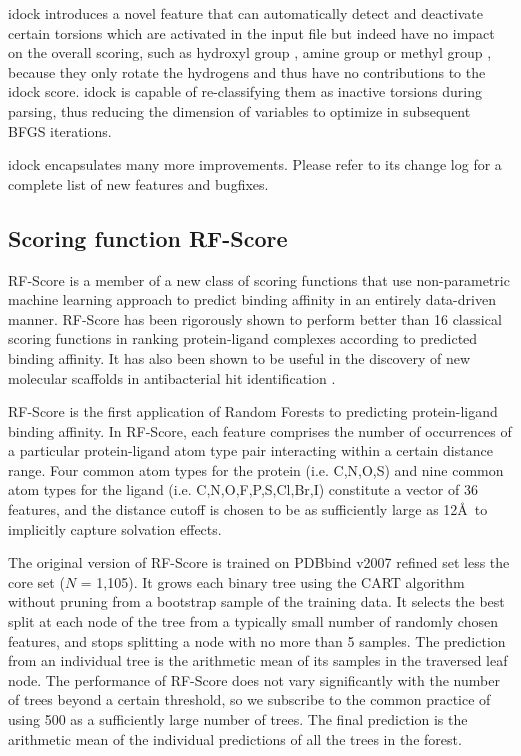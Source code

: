 idock introduces a novel feature that can automatically detect and deactivate certain torsions which are activated in the input file but indeed have no impact on the overall scoring, such as hydroxyl group , amine group  or methyl group , because they only rotate the hydrogens and thus have no contributions to the idock score. idock is capable of re-classifying them as inactive torsions during parsing, thus reducing the dimension of variables to optimize in subsequent BFGS iterations.

idock encapsulates many more improvements. Please refer to its change log for a complete list of new features and bugfixes.

\subsection{Scoring function RF-Score}

RF-Score \citep{564} is a member of a new class of scoring functions that use non-parametric machine learning approach to predict binding affinity in an entirely data-driven manner. RF-Score has been rigorously shown \citep{564,908} to perform better than 16 classical scoring functions in ranking protein-ligand complexes according to predicted binding affinity. It has also been shown to be useful in the discovery of new molecular scaffolds in antibacterial hit identification \citep{1281}.

RF-Score is the first application of Random Forests \citep{1309} to predicting protein-ligand binding affinity. In RF-Score, each feature comprises the number of occurrences of a particular protein-ligand atom type pair interacting within a certain distance range. Four common atom types for the protein (i.e. C,N,O,S) and nine common atom types for the ligand (i.e. C,N,O,F,P,S,Cl,Br,I) constitute a vector of 36 features, and the distance cutoff is chosen to be as sufficiently large as 12\AA\ to implicitly capture solvation effects.

The original version of RF-Score \citep{564} is trained on PDBbind v2007 refined set less the core set ($N$ = 1,105). It grows each binary tree using the CART algorithm \citep{1310} without pruning from a bootstrap sample of the training data. It selects the best split at each node of the tree from a typically small number of randomly chosen features, and stops splitting a node with no more than 5 samples. The prediction from an individual tree is the arithmetic mean of its samples in the traversed leaf node. The performance of RF-Score does not vary significantly with the number of trees beyond a certain threshold, so we subscribe to the common practice of using 500 as a sufficiently large number of trees. The final prediction is the arithmetic mean of the individual predictions of all the trees in the forest.

